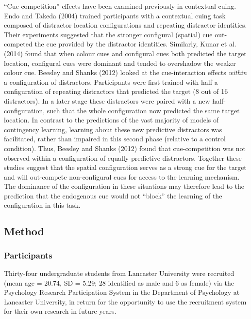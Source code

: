 \documentclass[
  man,floatsintext]{apa7}
\begin{document}
``Cue-competition'' effects have been examined previously in contextual cuing. Endo and Takeda (2004) trained participants with a contextual cuing task composed of distractor location configurations and repeating distractor identities. Their experiments suggested that the stronger configural (spatial) cue out-competed the cue provided by the distractor identities. Similarly, Kunar et al. (2014) found that when colour cues and configural cues both predicted the target location, configural cues were dominant and tended to overshadow the weaker colour cue. Beesley and Shanks (2012) looked at the cue-interaction effects \emph{within} a configuration of distractors. Participants were first trained with half a configuration of repeating distractors that predicted the target (8 out of 16 distractors). In a later stage these distractors were paired with a new half-configuration, such that the whole configuration now predicted the same target location. In contrast to the predictions of the vast majority of models of contingency learning, learning about these new predictive distractors was facilitated, rather than impaired in this second phase (relative to a control condition). Thus, Beesley and Shanks (2012) found that cue-competition was not observed within a configuration of equally predictive distractors. Together these studies suggest that the spatial configuration serves as a strong cue for the target and will out-compete non-configural cues for access to the learning mechanism. The dominance of the configuration in these situations may therefore lead to the prediction that the endogenous cue would not ``block'' the learning of the configuration in this task.

\hypertarget{method-1}{%
\subsection{Method}\label{method-1}}

\hypertarget{participants-1}{%
\subsubsection{Participants}\label{participants-1}}

Thirty-four undergraduate students from Lancaster University were recruited (mean age = 20.74, SD = 5.29; 28 identified as male and 6 as female) via the Psychology Research Participation System in the Department of Psychology at Lancaster University, in return for the opportunity to use the recruitment system for their own research in future years.
\end{document}
